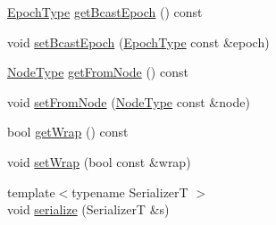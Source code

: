\begin{DoxyCompactItemize}
\item 
\hyperlink{namespacevt_a985a5adf291c34a3ca263b3378388236}{Epoch\+Type} \hyperlink{structvt_1_1vrt_1_1collection_1_1_collection_message_a81604b8f38e3ee3eea6caf6a1012175c}{get\+Bcast\+Epoch} () const
\item 
void \hyperlink{structvt_1_1vrt_1_1collection_1_1_collection_message_a513a81678ec43a110e39d957735831bd}{set\+Bcast\+Epoch} (\hyperlink{namespacevt_a985a5adf291c34a3ca263b3378388236}{Epoch\+Type} const \&epoch)
\item 
\hyperlink{namespacevt_a866da9d0efc19c0a1ce79e9e492f47e2}{Node\+Type} \hyperlink{structvt_1_1vrt_1_1collection_1_1_collection_message_a642d64890e3ef47a5561ceaede752181}{get\+From\+Node} () const
\item 
void \hyperlink{structvt_1_1vrt_1_1collection_1_1_collection_message_a5bd7fd9ea84e15d528e1546a98f4bd5e}{set\+From\+Node} (\hyperlink{namespacevt_a866da9d0efc19c0a1ce79e9e492f47e2}{Node\+Type} const \&node)
\item 
bool \hyperlink{structvt_1_1vrt_1_1collection_1_1_collection_message_adb0f0904b4bd0646e51dc0a76c54d487}{get\+Wrap} () const
\item 
void \hyperlink{structvt_1_1vrt_1_1collection_1_1_collection_message_a0c5a8830f6079278d7df90d0b6fc07b5}{set\+Wrap} (bool const \&wrap)
\item 
{\footnotesize template$<$typename SerializerT $>$ }\\void \hyperlink{structvt_1_1vrt_1_1collection_1_1_collection_message_a330305ca4c3bf4fec81d0f02637b9a59}{serialize} (SerializerT \&s)
\end{DoxyCompactItemize}
